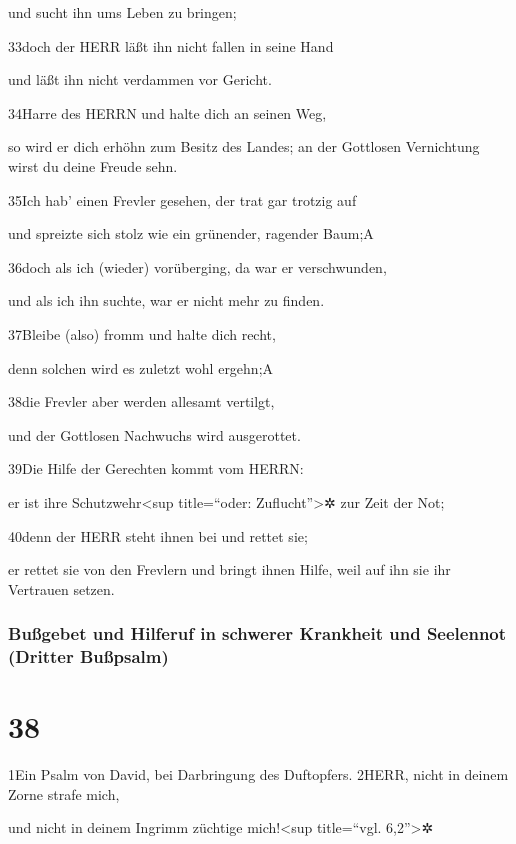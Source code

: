und sucht ihn ums Leben zu bringen;

33doch der HERR läßt ihn nicht fallen in seine Hand

und läßt ihn nicht verdammen vor Gericht.

34Harre des HERRN und halte dich an seinen Weg,

so wird er dich erhöhn zum Besitz des Landes; an der Gottlosen
Vernichtung wirst du deine Freude sehn.

35Ich hab' einen Frevler gesehen, der trat gar trotzig auf

und spreizte sich stolz wie ein grünender, ragender Baum;{A}

36doch als ich (wieder) vorüberging, da war er verschwunden,

und als ich ihn suchte, war er nicht mehr zu finden.

37Bleibe (also) fromm und halte dich recht,

denn solchen wird es zuletzt wohl ergehn;{A}

38die Frevler aber werden allesamt vertilgt,

und der Gottlosen Nachwuchs wird ausgerottet.

39Die Hilfe der Gerechten kommt vom HERRN:

er ist ihre Schutzwehr\textless sup title=``oder:
Zuflucht''\textgreater✲ zur Zeit der Not;

40denn der HERR steht ihnen bei und rettet sie;

er rettet sie von den Frevlern und bringt ihnen Hilfe, weil auf ihn sie
ihr Vertrauen setzen.

\hypertarget{buuxdfgebet-und-hilferuf-in-schwerer-krankheit-und-seelennot-dritter-buuxdfpsalm}{%
\subsubsection{Bußgebet und Hilferuf in schwerer Krankheit und Seelennot
(Dritter
Bußpsalm)}\label{buuxdfgebet-und-hilferuf-in-schwerer-krankheit-und-seelennot-dritter-buuxdfpsalm}}

\hypertarget{section-37}{%
\section{38}\label{section-37}}

1Ein Psalm von David, bei Darbringung des Duftopfers. 2HERR, nicht in
deinem Zorne strafe mich,

und nicht in deinem Ingrimm züchtige mich!\textless sup title=``vgl.
6,2''\textgreater✲

